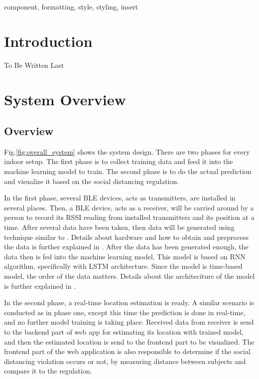 \documentclass[conference]{IEEEtran}
\begin{document}
\begin{abstract}
This document is a model and instructions for \LaTeX.
This and the IEEEtran.cls file define the components of your paper [title, text, heads, etc.]. *CRITICAL: Do Not Use Symbols, Special Characters, Footnotes, 
or Math in Paper Title or Abstract.
\end{abstract}

\begin{IEEEkeywords}
component, formatting, style, styling, insert
\end{IEEEkeywords}

\section{Introduction}
To Be Written Last

\section{System Overview}

\subsection{Overview}

Fig.\ref{fig:overall_system} shows the system design.
There are two phases for every indoor setup.
The first phase is to collect training data and feed it into the machine learning model
to train. The second phase is to do the actual prediction and visualize 
it based on the social distancing regulation. 

In the first phase, several BLE devices, acts as transmitters, are installed 
in several places. Then, a BLE device, acts as a receiver, will be carried 
around by a person to record its RSSI reading from installed transmitters and its
position at a time. After several data have been taken, then data will be
generated using technique similar to \cite{Urano2021}. Details about hardware
and how to obtain and preprocess the data is further explained in \cite{Husni}.
After the data has been generated enough, the data then is fed
into the machine learning model. This model is based on RNN algorithm,
specifically with LSTM architecture. Since the model is time-based model,
the order of the data matters. Details about the architeciture of the model
is further explained in \cite{Afif}. 

In the second phase, a real-time location estimation is ready. A similar 
scenario is conducted as in phase one, except this time the prediction 
is done in real-time, and no further model training is taking place. Received
data from receiver is send to the backend part of web app for estimating its location 
with trained model, and then the estimated location is send to the frontend
part to be visualized. The frontend part of the web application is also 
responsible to determine if the social distancing violation occurs or not, by 
measuring distance between subjects and compare it to the regulation.  
\end{document}
